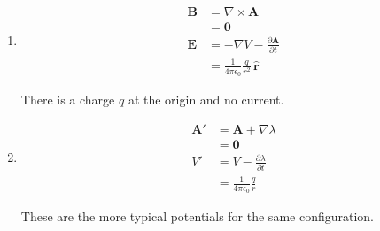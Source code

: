 \documentclass{article}
\renewcommand{\vec}[1]{\boldsymbol{\mathbf{#1}}}
\newcommand{\uvec}[1]{\hat{\vec{#1}}}
\newcommand{\ke}{\frac{1}{4 \pi \epsilon_0}}
\begin{document}
\subsection{}

\begin{enumerate}
  \item

        \begin{align*}
          \vec{B} & = \nabla \times \vec{A}                           \\
                  & = \vec{0}                                         \\
          \vec{E} & = -\nabla V - \frac{\partial \vec{A}}{\partial t} \\
                  & = \ke \frac{q}{r^2} \,\uvec{r}
        \end{align*}

        There is a charge $q$ at the origin and no current.

  \item

        \begin{align*}
          \vec{A}' & = \vec{A} + \nabla \lambda                \\
                   & = \vec{0}                                 \\
          V'       & = V - \frac{\partial \lambda}{\partial t} \\
                   & = \ke \frac{q}{r}
        \end{align*}

        These are the more typical potentials for the same configuration.
\end{enumerate}

\subsection{}
\end{document}
